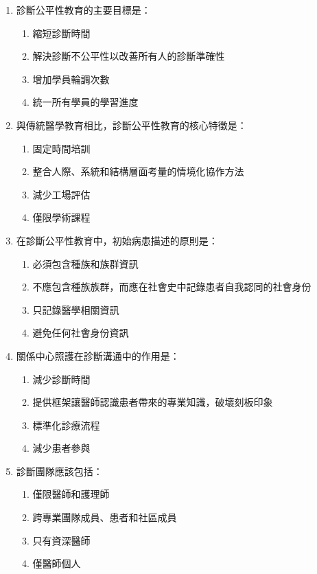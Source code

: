 \documentclass[12pt,a4paper]{article}
\begin{document}
\begin{enumerate}
    \item 診斷公平性教育的主要目標是：
    \begin{enumerate}[label=\alph*)]
        \item 縮短診斷時間
        \item 解決診斷不公平性以改善所有人的診斷準確性
        \item 增加學員輪調次數
        \item 統一所有學員的學習進度
    \end{enumerate}

    \item 與傳統醫學教育相比，診斷公平性教育的核心特徵是：
    \begin{enumerate}[label=\alph*)]
        \item 固定時間培訓
        \item 整合人際、系統和結構層面考量的情境化協作方法
        \item 減少工場評估
        \item 僅限學術課程
    \end{enumerate}

    \item 在診斷公平性教育中，初始病患描述的原則是：
    \begin{enumerate}[label=\alph*)]
        \item 必須包含種族和族群資訊
        \item 不應包含種族族群，而應在社會史中記錄患者自我認同的社會身份
        \item 只記錄醫學相關資訊
        \item 避免任何社會身份資訊
    \end{enumerate}

    \item 關係中心照護在診斷溝通中的作用是：
    \begin{enumerate}[label=\alph*)]
        \item 減少診斷時間
        \item 提供框架讓醫師認識患者帶來的專業知識，破壞刻板印象
        \item 標準化診療流程
        \item 減少患者參與
    \end{enumerate}

    \item 診斷團隊應該包括：
    \begin{enumerate}[label=\alph*)]
        \item 僅限醫師和護理師
        \item 跨專業團隊成員、患者和社區成員
        \item 只有資深醫師
        \item 僅醫師個人
    \end{enumerate}


\end{enumerate}
\end{document}
